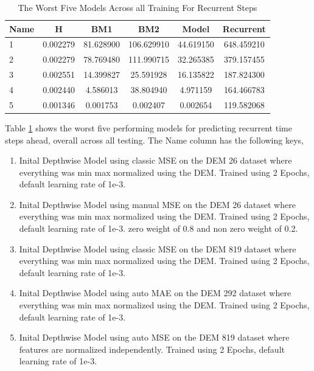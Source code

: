 \begin{table}[htbp]
	\centering
	\caption{The Worst Five Models Across all Training For Recurrent Steps}
	\label{tab:worstr}
	\begin{tabular}{p{2cm}ccccc}
		\toprule
		Name &  H &  BM1 &  BM2 &  Model &  Recurrent \\
		\midrule
		1 &       0.002279 &       81.628900 &      106.629910 &  44.619150 &          648.459210 \\
		2 &       0.002279 &       78.769480 &      111.990715 &  32.265385 &          379.157455 \\
		3 &       0.002551 &       14.399827 &       25.591928 &  16.135822 &          187.824300 \\
		4 &       0.002440 &        4.586013 &       38.804940 &   4.971159 &          164.466783 \\
		5 &       0.001346 &        0.001753 &        0.002407 &   0.002654 &          119.582068 \\
		\bottomrule
	\end{tabular}
\end{table}

Table \ref{tab:worstr} shows the worst five performing models for predicting recurrent time steps ahead, overall across all testing. The Name column has the following keys,
\begin{enumerate}
	\item Inital Depthwise Model using classic MSE on the DEM 26 dataset where everything was min max normalized using the DEM. Trained using 2 Epochs, default learning rate of 1e-3.
	\item Inital Depthwise Model using manual MSE on the DEM 26 dataset where everything was min max normalized using the DEM. Trained using 2 Epochs, default learning rate of 1e-3. zero weight of 0.8 and non zero weight of 0.2.
	\item Inital Depthwise Model using classic MSE on the DEM 819 dataset where everything was min max normalized using the DEM. Trained using 2 Epochs, default learning rate of 1e-3.
	\item Inital Depthwise Model using  auto MAE on the DEM 292 dataset where everything was min max normalized using the DEM. Trained using 2 Epochs, default learning rate of 1e-3.
	\item Inital Depthwise Model using  auto MSE on the DEM 819 dataset where features are normalized independently. Trained using 2 Epochs, default learning rate of 1e-3.
\end{enumerate}

